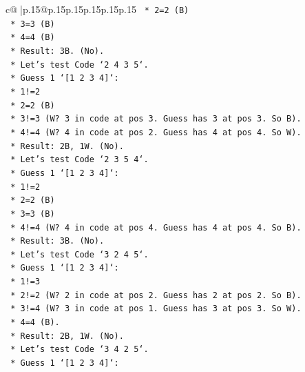 \documentclass{article}
\begin{document}
{\begin{supertabular}{c@{$\;$}|p{.15\linewidth}@{}p{.15\linewidth}p{.15\linewidth}p{.15\linewidth}p{.15\linewidth}p{.15\linewidth}}
{{{\texttt{                    *   2=2 (B)} \\
\texttt{                    *   3=3 (B)} \\
\texttt{                    *   4=4 (B)} \\
\texttt{                    *   Result: 3B. (No).} \\
\texttt{            *   Let's test Code `2 4 3 5`.} \\
\texttt{                *   Guess 1 `{[}1 2 3 4{]}`:} \\
\texttt{                    *   1!=2} \\
\texttt{                    *   2=2 (B)} \\
\texttt{                    *   3!=3 (W? 3 in code at pos 3. Guess has 3 at pos 3. So B).} \\
\texttt{                    *   4!=4 (W? 4 in code at pos 2. Guess has 4 at pos 4. So W).} \\
\texttt{                    *   Result: 2B, 1W. (No).} \\
\texttt{            *   Let's test Code `2 3 5 4`.} \\
\texttt{                *   Guess 1 `{[}1 2 3 4{]}`:} \\
\texttt{                    *   1!=2} \\
\texttt{                    *   2=2 (B)} \\
\texttt{                    *   3=3 (B)} \\
\texttt{                    *   4!=4 (W? 4 in code at pos 4. Guess has 4 at pos 4. So B).} \\
\texttt{                    *   Result: 3B. (No).} \\
\texttt{            *   Let's test Code `3 2 4 5`.} \\
\texttt{                *   Guess 1 `{[}1 2 3 4{]}`:} \\
\texttt{                    *   1!=3} \\
\texttt{                    *   2!=2 (W? 2 in code at pos 2. Guess has 2 at pos 2. So B).} \\
\texttt{                    *   3!=4 (W? 3 in code at pos 1. Guess has 3 at pos 3. So W).} \\
\texttt{                    *   4=4 (B).} \\
\texttt{                    *   Result: 2B, 1W. (No).} \\
\texttt{            *   Let's test Code `3 4 2 5`.} \\
\texttt{                *   Guess 1 `{[}1 2 3 4{]}`:} \\
}}}
\end{supertabular}}
\end{document}
